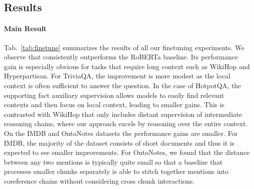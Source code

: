 \subsection{Results}

\paragraph{Main Result}
Tab.~\ref{tab:finetune} summarizes the results of all our finetuning experiments. We observe that \model consistently outperforms the RoBERTa baseline. 
Its performance gain is especially obvious for tasks that require long context such as WikiHop and Hyperpartisan.
For TriviaQA, the improvement is more modest as the local context is often sufficient to answer the question.
In the case of HotpotQA, the supporting fact auxiliary supervision allows models to easily find relevant contexts and then focus on local context, leading to smaller gains.  This is contrasted with WikiHop that only includes distant supervision of intermediate reasoning chains, where our approach excels by reasoning over the entire context.
On the IMDB and OntoNotes datasets the performance gains are smaller. For IMDB, the majority of the dataset consists of short documents and thus it is expected to see smaller improvements.
For OntoNotes, we found that the distance between any two mentions is typically quite small so that a baseline that processes smaller chunks separately is able to stitch together mentions into coreference chains without considering cross chunk interactions.


